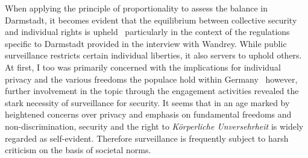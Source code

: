 \documentclass[12pt]{article}
\begin{document}
	When applying the principle of proportionality to assess the balance in Darmstadt, it becomes evident that the equilibrium between collective security and individual rights is upheld \textemdash\ particularly in the context of the regulations specific to Darmstadt provided in the interview with Wandrey. While public surveillance restricts certain individual liberties, it also servers to uphold others. At first, I too was primarily concerned with the implications for individual privacy and the various freedoms the populace hold within Germany \textemdash\ however, further involvement in the topic through the engagement activities revealed the stark necessity of surveillance for security. It seems that in an age marked by heightened concerns over privacy and emphasis on fundamental freedoms and non-discrimination, security and the right to \textit{Körperliche Unversehrheit} is widely regarded as self-evident. Therefore surveillance is frequently subject to harsh criticism on the basis of societal norms. 
	
	
	
	
	\clearpage
	
	\printbibliography
	
\end{document}
